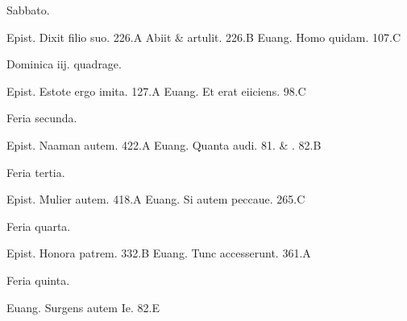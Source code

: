 \documentclass[a5paper,10pt]{book}
\begin{document}
\begin{multicols}{2}
\begin{center}
\color{red} Sabbato.
\end{center}
\vspace{-.75em}
\par \noindent Epist. Dixit filio suo. \hfill 226.A
\newline Abiit \& artulit. \hfill 226.B
\newline Euang. Homo quidam. \hfill 107.C
\newline \vspace{-1.75em}
\begin{center}
\color{red} Dominica iij. quadrage.
\end{center}
\vspace{-.75em}
\par \noindent Epist. Estote ergo imita. \hfill 127.A
\newline Euang. Et erat eiiciens. \hfill 98.C
\newline \vspace{-1.75em}
\begin{center}
\color{red} Feria secunda.
\end{center}
\vspace{-.75em}
\par \noindent Epist. Naaman autem. \hfill 422.A
\newline Euang. Quanta audi. \hfill 81. \& . 82.B
\newline \vspace{-1.75em}
\begin{center}
\color{red} Feria tertia.
\end{center}
\vspace{-.75em}
\par \noindent Epist. Mulier autem. \hfill 418.A
\newline Euang. Si autem peccaue. \hfill 265.C
\newline \vspace{-1.75em}
\begin{center}
\color{red} Feria quarta.
\end{center}
\vspace{-.75em}
\par \noindent Epist. Honora patrem. \hfill 332.B
\newline Euang. Tunc accesserunt. \hfill 361.A
\newline \vspace{-1.75em}
\begin{center}
\color{red} Feria quinta.
\end{center}
\vspace{-.75em}
\par \noindent Euang. Surgens autem Ie. \hfill 82.E

\end{multicols}
\end{document}
